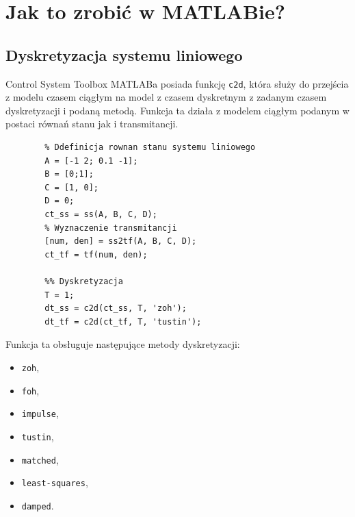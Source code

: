 \documentclass{article}
\begin{document}
   
\section{Jak to zrobić w MATLABie?}
    \subsection{Dyskretyzacja systemu liniowego}
    Control System Toolbox MATLABa posiada funkcję \texttt{c2d}, która służy do przejścia z modelu czasem ciągłym na model z czasem dyskretnym z zadanym czasem dyskretyzacji i podaną metodą.
    Funkcja ta działa z modelem ciągłym podanym w  postaci równań stanu jak i transmitancji.
    \begin{lstlisting}[style=Matlab-editor]
        %% Systenm ciagly
        % Ddefinicja rownan stanu systemu liniowego
        A = [-1 2; 0.1 -1];
        B = [0;1];
        C = [1, 0];
        D = 0;
        ct_ss = ss(A, B, C, D);
        % Wyznaczenie transmitancji
        [num, den] = ss2tf(A, B, C, D);
        ct_tf = tf(num, den);
        
        %% Dyskretyzacja
        T = 1;
        dt_ss = c2d(ct_ss, T, 'zoh');
        dt_tf = c2d(ct_tf, T, 'tustin');
    \end{lstlisting}

    Funkcja ta obsługuje następujące metody dyskretyzacji:
    \begin{itemize}
        \item \texttt{zoh},
        \item \texttt{foh},
        \item \texttt{impulse},
        \item \texttt{tustin},
        \item \texttt{matched},
        \item \texttt{least-squares},
        \item \texttt{damped}.
    \end{itemize}

\end{document}
